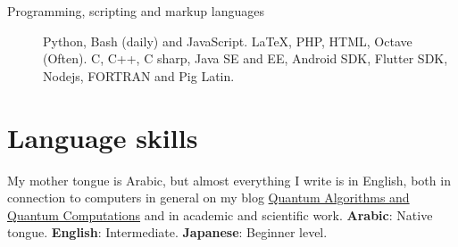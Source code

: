 \documentclass[margin,line,a4paper]{resume}
\begin{document}
\begin{resume}
\begin{description}
    \item[Programming, scripting and markup languages] Python, Bash (daily) and JavaScript. \LaTeX, PHP, HTML, Octave (Often). C, C++, C sharp, Java SE and EE, Android SDK, Flutter SDK, Nodejs, FORTRAN and Pig Latin.
\end{description}
    

\section{\mysidestyle Language skills}
    My mother tongue is Arabic, but almost everything I write is in English, both in connection to computers in general on my blog \href{https://qaqcblog.quora.com/}{Quantum Algorithms and Quantum Computations} and in academic and scientific work. \textbf{Arabic}: Native tongue. \textbf{English}: Intermediate. \textbf{Japanese}: Beginner level.
   






















\end{resume}
\end{document}
